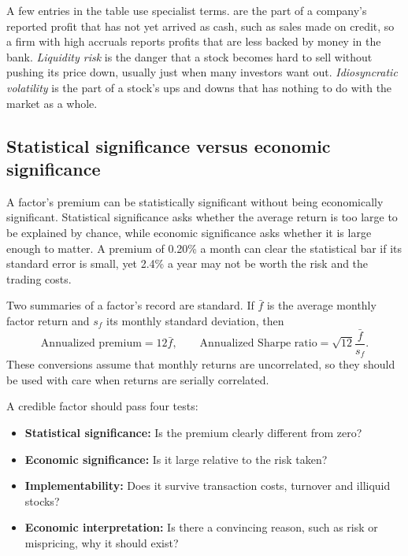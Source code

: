 A few entries in the table use specialist terms.  are the part of a company's reported profit that has not yet arrived as cash, such as sales made on credit, so a firm with high accruals reports profits that are less backed by money in the bank. \emph{Liquidity risk} is the danger that a stock becomes hard to sell without pushing its price down, usually just when many investors want out. \emph{Idiosyncratic volatility} is the part of a stock's ups and downs that has nothing to do with the market as a whole.


\subsection{Statistical significance versus economic significance}
\label{subsec:04-statistical-economic-significance}

A factor's premium can be statistically significant without being economically significant. Statistical significance asks whether the average return is too large to be explained by chance, while economic significance asks whether it is large enough to matter. A premium of 0.20\% a month can clear the statistical bar if its standard error is small, yet 2.4\% a year may not be worth the risk and the trading costs.

Two summaries of a factor's record are standard. If $\bar{f}$ is the average monthly factor return and $s_f$ its monthly standard deviation, then
\begin{equation}
  \text{Annualized premium}=12\bar{f},
  \qquad
  \text{Annualized Sharpe ratio}
  =\sqrt{12}\frac{\bar{f}}{s_f}.
  \label{eq:04-factor-sharpe}
\end{equation}
These conversions assume that monthly returns are uncorrelated, so they should be used with care when returns are serially correlated.

A credible factor should pass four tests:

\begin{itemize}
  \item \textbf{Statistical significance:} Is the premium clearly different from zero?
  \item \textbf{Economic significance:} Is it large relative to the risk taken?
  \item \textbf{Implementability:} Does it survive transaction costs, turnover and illiquid stocks?
  \item \textbf{Economic interpretation:} Is there a convincing reason, such as risk or mispricing, why it should exist?
\end{itemize}

